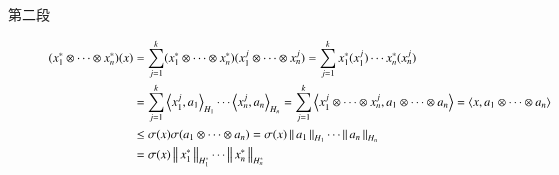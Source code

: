 	\begin{prf}
		\begin{description}
			\item[第二段]
				\begin{align}
					(x^*_1 \otimes \cdots \otimes x^*_n)(x)
					&= \sum_{j=1}^{k} (x^*_1 \otimes \cdots \otimes x^*_n)(x^j_1 \otimes \cdots \otimes x^j_n)
					= \sum_{j=1}^{k} x^*_1(x^j_1) \cdots x^*_n(x^j_n) \\
					&= \sum_{j=1}^{k} \inprod<x^j_1,a_1>_{H_1} \cdots \inprod<x^j_n,a_n>_{H_n}
					= \sum_{j=1}^{k} \inprod<x^j_1 \otimes \cdots \otimes x^j_n,a_1 \otimes \cdots \otimes a_n>
					= \inprod<x,a_1 \otimes \cdots \otimes a_n> \\
					&\leq \sigma(x) \sigma(a_1 \otimes \cdots \otimes a_n)
					= \sigma(x) \Norm{a_1}{H_1} \cdots \Norm{a_n}{H_n} \\
					&= \sigma(x) \Norm{x^*_1}{H^*_1} \cdots \Norm{x^*_n}{H^*_n}
				\end{align}
		\end{description}
	\end{prf}
	
	\begin{screen}
		\begin{thm}
		\end{thm}
	\end{screen}